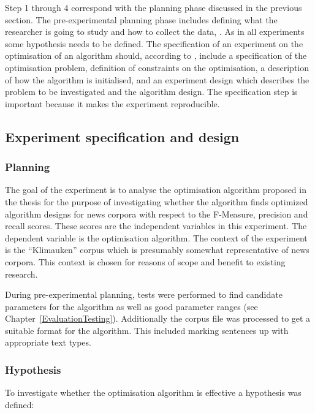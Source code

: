 Step 1 through 4 correspond with the planning phase discussed in the previous section. The pre-experimental planning phase includes defining what the researcher is going to study and how to collect the data, \parencite{Bartz-Beielstein2004}. As in all experiments some hypothesis needs to be defined. The specification of an experiment on the optimisation of an algorithm should, according to \citeauthor{Bartz-Beielstein2004}, include a specification of the optimisation problem, definition of constraints on the optimisation, a description of how the algorithm is initialised, and an experiment design which describes the problem to be investigated and the algorithm design. The specification step is important because it makes the experiment reproducible.

\subsection{Experiment specification and design}

\subsubsection{Planning}
The goal of the experiment is to analyse the optimisation algorithm proposed in the thesis for the purpose of investigating whether the algorithm finds optimized algorithm designs for news corpora  with respect to the F-Measure, precision and recall scores. These scores are the independent variables in this experiment. The dependent variable is the optimisation algorithm. The context of the experiment is the ``Klimauken'' corpus which is presumably somewhat representative of news corpora. This context is chosen for reasons of scope and benefit to existing research.

During pre-experimental planning, tests were performed to find candidate parameters for the algorithm as well as good parameter ranges (see Chapter~\ref{EvaluationTesting}). Additionally the corpus file was processed to get a suitable format for the \CTC algorithm. This included marking sentences up with appropriate text types.

\subsubsection{Hypothesis}

To investigate whether the optimisation algorithm is effective a hypothesis was defined:

